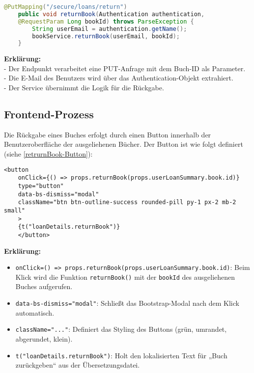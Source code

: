 \begin{lstlisting}[language=Java, caption=returnBook() Endpoint in BookController.java, label=lst:returnBook()]
	@PutMapping("/secure/loans/return")
	public void returnBook(Authentication authentication,
	@RequestParam Long bookId) throws ParseException {
		String userEmail = authentication.getName();
		bookService.returnBook(userEmail, bookId);
	}
\end{lstlisting}

\noindent \textbf{Erklärung:}\\
- Der Endpunkt verarbeitet eine PUT-Anfrage mit dem Buch-ID als Parameter.\\
- Die E-Mail des Benutzers wird über das Authentication-Objekt extrahiert.\\
- Der Service übernimmt die Logik für die Rückgabe.

\subsection{Frontend-Prozess}
Die Rückgabe eines Buches erfolgt durch einen Button innerhalb der Benutzeroberfläche  der ausgeliehenen Bücher. Der Button ist wie folgt definiert (siehe \ref{retrurnBook-Button}):

\begin{lstlisting}[style=pseudocode, caption=retrurnBook-Button in LoanDetailsModal.tsx, label=retrurnBook-Button]
	<button
	onClick={() => props.returnBook(props.userLoanSummary.book.id)}
	type="button"
	data-bs-dismiss="modal"
	className="btn btn-outline-success rounded-pill py-1 px-2 mb-2 small"
	>
	{t("loanDetails.returnBook")}
	</button>
\end{lstlisting}

\noindent \textbf{Erklärung:}
\begin{itemize}
	\item \texttt{onClick={() => props.returnBook(props.userLoanSummary.book.id)}}: Beim Klick wird die Funktion \texttt{returnBook()} mit der \texttt{bookId} des ausgeliehenen Buches aufgerufen.
	\item \texttt{data-bs-dismiss="modal"}: Schließt das Bootstrap-Modal nach dem Klick automatisch.
	\item \texttt{className="..."}: Definiert das Styling des Buttons (grün, umrandet, abgerundet, klein).
	\item \texttt{{t("loanDetails.returnBook")}}: Holt den lokalisierten Text für „Buch zurückgeben“ aus der Übersetzungsdatei.
\end{itemize}

